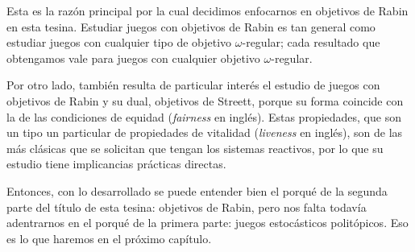 Esta es la razón principal por la cual decidimos enfocarnos en objetivos de
Rabin en esta tesina. Estudiar juegos con objetivos de Rabin es tan general
como estudiar juegos con cualquier tipo de objetivo $\omega$-regular; cada
resultado que obtengamos vale para juegos con cualquier objetivo
$\omega$-regular.

Por otro lado, también resulta de particular interés el estudio de juegos con
objetivos de Rabin y su dual, objetivos de Streett, porque su forma coincide
con la de las condiciones de equidad (\textit{fairness} en inglés). Estas
propiedades, que son un tipo un particular de propiedades de vitalidad
(\textit{liveness} en inglés), son de las más clásicas que se solicitan que
tengan los sistemas reactivos, por lo que su estudio tiene implicancias
prácticas directas.


Entonces, con lo desarrollado se puede entender bien el porqué de la segunda
parte del título de esta tesina: objetivos de Rabin, pero nos falta todavía
adentrarnos en el porqué de la primera parte: juegos estocásticos politópicos.
Eso es lo que haremos en el próximo capítulo.

